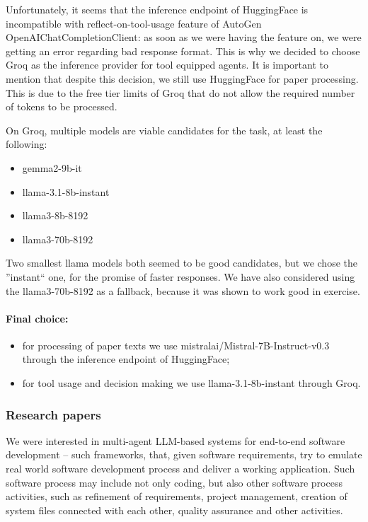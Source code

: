 Unfortunately, it seems that the inference endpoint of HuggingFace is incompatible with reflect-on-tool-usage feature of AutoGen OpenAIChatCompletionClient: as soon as we were having the feature on, we were getting an error regarding bad response format. This is why we decided to choose Groq as the inference provider for tool equipped agents. It is important to mention that despite this decision, we still use HuggingFace for paper processing. This is due to the free tier limits of Groq that do not allow the required number of tokens to be processed.

On Groq, multiple models are viable candidates for the task, at least the following:

\begin{itemize}
	\item gemma2-9b-it
	\item llama-3.1-8b-instant
	\item llama3-8b-8192
	\item llama3-70b-8192
\end{itemize}

Two smallest llama models both seemed to be good candidates, but we chose the ''instant`` one, for the promise of faster responses. We have also considered using the llama3-70b-8192 as a fallback, because it was shown to work good in exercise.

\paragraph{Final choice:}

\begin{itemize}
	\item for processing of paper texts we use mistralai/Mistral-7B-Instruct-v0.3 through the inference endpoint of HuggingFace;
	\item for tool usage and decision making we use llama-3.1-8b-instant through Groq.
\end{itemize}


\subsubsection{Research papers}

We were interested in multi-agent LLM-based systems for end-to-end software development -- such frameworks, that, given software requirements, try to emulate real world software development process and deliver a working application. Such software process  may include not only coding, but also other software process activities, such as refinement of requirements, project management, creation of system files connected with each other, quality assurance and other activities. 

